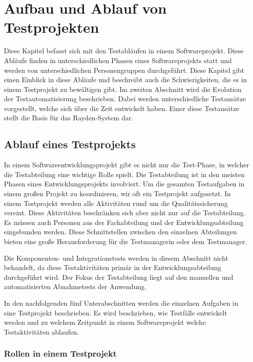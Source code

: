 \chapter{Aufbau und Ablauf von Testprojekten}
\label{cha:Konzept}

Diese Kapitel befasst sich mit den Testabläufen in einem Softwareprojekt. Diese Abläufe finden in unterschiedlichen Phasen eines Softwareprojekts statt und werden von unterschiedlichen Personengruppen durchgeführt. Diese Kapitel gibt einen Einblick in diese Abläufe und beschreibt auch die Schwierigkeiten, die es in einem Testprojekt zu bewältigen gibt. Im zweiten Abschnitt wird die Evolution der Testautomatisierung beschrieben. Dabei werden unterschiedliche Testansätze vorgestellt, welche sich über die Zeit entwickelt haben. Einer diese Testansätze stellt die Basis für das Rayden-System dar.

\section{Ablauf eines Testprojekts}

In einem Softwareentwicklungsprojekt gibt es nicht nur die Test-Phase, in welcher die Testabteilung eine wichtige Rolle spielt. Die Testabteilung ist in den meisten Phasen eines Entwicklungsprojekts involviert. Um die gesamten Testaufgaben in einem großen Projekt zu koordinieren, wir oft ein Testprojekt aufgesetzt. In einem Testprojekt werden alle Aktivitäten rund um die Qualitätssicherung vereint. Diese Aktivitäten beschränken sich aber nicht nur auf die Testabteilung. Es müssen auch Personen aus der Fachabteilung und der Entwicklungsabteilung eingebunden werden. Diese Schnittstellen zwischen den einzelnen Abteilungen bieten eine große Herausforderung für die Testmanagerin oder dem Testmanager.

\SuperPar
Die Komponenten- und Integrationstests werden in diesem Abschnitt nicht behandelt, da diese Testaktivitäten primär in der Entwicklungsabteilung durchgeführt wird. Der Fokus der Testabteilung liegt auf den manuellen und automatisierten Abnahmetests der Anwendung.

\SuperPar
In den nachfolgenden fünf Unterabschnitten werden die einzelnen Aufgaben in eine Testprojekt beschrieben. Es wird beschrieben, wie Testfälle entwickelt werden und zu welchem Zeitpunkt in einem Softwareprojekt welche Testaktivitäten ablaufen.

\subsection{Rollen in einem Testprojekt}

